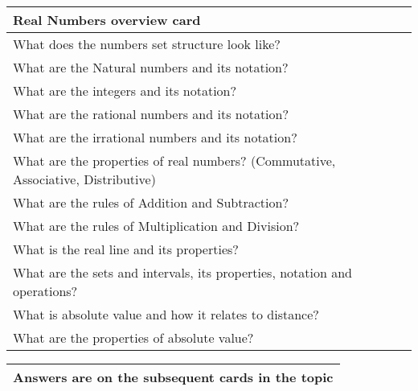 \begin{small}
    \begin{tabularx}{1\textwidth}{
            p{}
        }
        \toprule
        \textbf{Real Numbers overview card} \\
        \toprule

        What does the numbers set structure look like? 
        \\
        \midrule

        What are the Natural numbers and its notation?
        \\
        \midrule

        What are the integers and its notation?
        \\
        \midrule

        What are the rational numbers and its notation?
        \\
        \midrule

        What are the irrational numbers and its notation?
        \\
        \midrule

        What are the properties of real numbers? (Commutative, Associative,
        Distributive)
        \\
        \midrule

        What are the rules of Addition and Subtraction?
        \\
        \midrule

        What are the rules of Multiplication and Division?
        \\
        \midrule

        What is the real line and its properties?
        \\
        \midrule

        What are the sets and intervals, its properties, notation and
        operations?
        \\
        \midrule

        What is absolute value and how it relates to distance?
        \\
        \midrule

        What are the properties of absolute value?
        \\
        \bottomrule

    \end{tabularx}
\end{small}
\begin{small}
    \begin{tabularx}{1\textwidth}{
            p{}
        }
        \toprule
        \textbf{Answers are on the subsequent cards in the topic} \\
        \toprule

    \end{tabularx}
\end{small}
